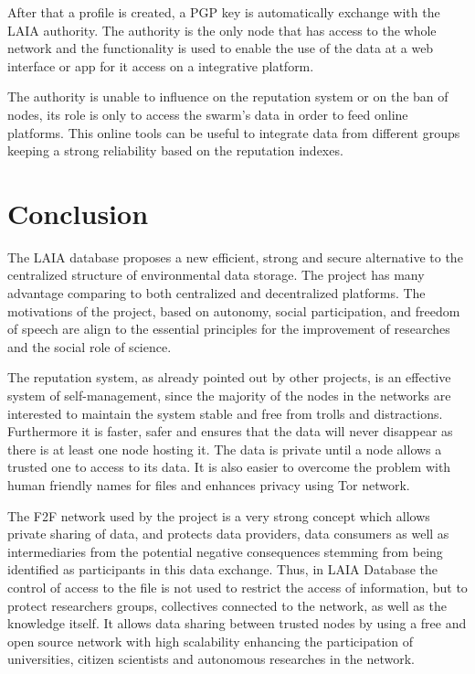 \documentclass[conference,final,]{IEEEtran}
\begin{document}
After that a profile is created, a PGP key is automatically exchange
with the LAIA authority. The authority is the only node that has access
to the whole network and the functionality is used to enable the use of
the data at a web interface or app for it access on a integrative platform.

The authority is unable to influence on the reputation system or on the 
ban of nodes, its role is only to access the swarm's data in order to feed online 
platforms. This online tools can be useful to integrate data from different groups 
keeping a strong reliability based on the reputation indexes.



\hypertarget{conclusion}{%
\section{Conclusion}\label{conclusion}}

The LAIA database proposes a new efficient, strong and secure
alternative to the centralized structure of environmental data storage.
The project has many advantage comparing to both centralized and
decentralized platforms. The motivations of the project, based on
autonomy, social participation, and freedom of speech are align to the
essential principles for the improvement of researches and the social
role of science.

The reputation system, as already pointed out by other projects, is an
effective system of self-management, since the majority of the nodes in
the networks are interested to maintain the system stable and free from
trolls and distractions. Furthermore it is faster, safer and ensures
that the data will never disappear as there is at least one node hosting
it. The data is private until a node allows a trusted one to access to
its data. It is also easier to overcome the problem with human friendly
names for files and enhances privacy using Tor network.

The F2F network used by the project is a very strong concept which
allows private sharing of data, and protects data providers, data
consumers as well as intermediaries from the potential negative
consequences stemming from being identified as participants in this data
exchange. Thus, in LAIA Database the control of access to the file is
not used to restrict the access of information, but to protect
researchers groups, collectives connected to the network, as well as the
knowledge itself. It allows data sharing between trusted nodes by using
a free and open source network with high scalability enhancing
the participation of universities, citizen scientists and autonomous
researches in the network.
\end{document}
